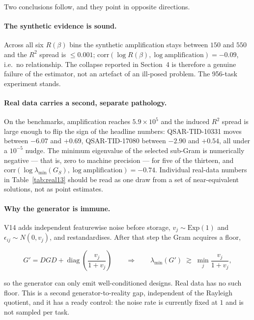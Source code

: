 \documentclass[11pt]{article}
\newcommand{\Rq}{R(\beta)}
\begin{document}
Two conclusions follow, and they point in opposite directions.

\paragraph{The synthetic evidence is sound.}
Across all six $\Rq$ bins the synthetic amplification stays between $150$ and
$550$ and the $R^2$ spread is $\le 0.001$;
$\mathrm{corr}(\log \Rq, \log \text{amplification}) = -0.09$, i.e.\ no
relationship. The collapse reported in Section~4 is therefore a genuine
failure of the estimator, not an artefact of an ill-posed problem. The
956-task experiment stands.

\paragraph{Real data carries a second, separate pathology.}
On the benchmarks, amplification reaches $5.9 \times 10^{5}$ and the induced
$R^2$ spread is large enough to flip the sign of the headline numbers:
QSAR-TID-10331 moves between $-6.07$ and $+0.69$, QSAR-TID-17080 between
$-2.90$ and $+0.54$, all under a $10^{-5}$ nudge. The minimum eigenvalue of
the selected sub-Gram is numerically negative --- that is, zero to machine
precision --- for five of the thirteen, and
$\mathrm{corr}(\log \lambda_{\min}(G_S), \log \text{amplification}) = -0.74$.
Individual real-data numbers in Table~\ref{tab:real13} should be read as one
draw from a set of near-equivalent solutions, not as point estimates.

\paragraph{Why the generator is immune.}
V14 adds independent featurewise noise before storage,
$v_j \sim \mathrm{Exp}(1)$ and $\epsilon_{ij} \sim N(0, v_j)$, and
restandardises. After that step the Gram acquires a floor,

\begin{equation}
G' = DGD + \operatorname{diag}\!\left(\frac{v_j}{1+v_j}\right)
\qquad\Longrightarrow\qquad
\lambda_{\min}(G') \;\gtrsim\; \min_j \frac{v_j}{1+v_j},
\end{equation}

so the generator can only emit well-conditioned designs. Real data has no
such floor. This is a second generator-to-reality gap, independent of the
Rayleigh quotient, and it has a ready control: the noise rate is currently
fixed at $1$ and is not sampled per task.
\end{document}
